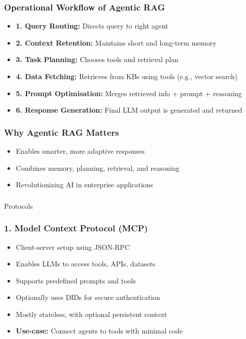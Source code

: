 \begin{frame}[fragile]\frametitle{Operational Workflow of Agentic RAG}
    \begin{itemize}
        \item \textbf{1. Query Routing:} Directs query to right agent
        \item \textbf{2. Context Retention:} Maintains short and long-term memory
        \item \textbf{3. Task Planning:} Chooses tools and retrieval plan
        \item \textbf{4. Data Fetching:} Retrieves from KBs using tools (e.g., vector search)
        \item \textbf{5. Prompt Optimisation:} Merges retrieved info + prompt + reasoning
        \item \textbf{6. Response Generation:} Final LLM output is generated and returned
    \end{itemize}
\end{frame}

\begin{frame}[fragile]\frametitle{Why Agentic RAG Matters}
    \begin{itemize}
        \item Enables smarter, more adaptive responses
        \item Combines memory, planning, retrieval, and reasoning
        \item Revolutionizing AI in enterprise applications
    \end{itemize}
\end{frame}

\begin{frame}[fragile]\frametitle{}
\begin{center}
{\Large Protocols}
\end{center}
\end{frame}

\begin{frame}[fragile]\frametitle{1. Model Context Protocol (MCP)}
      \begin{itemize}
        \item Client-server setup using JSON-RPC
        \item Enables LLMs to access tools, APIs, datasets
        \item Supports predefined prompts and tools
        \item Optionally uses DIDs for secure authentication
        \item Mostly stateless, with optional persistent context
        \item \textbf{Use-case:} Connect agents to tools with minimal code
      \end{itemize}
\end{frame}

